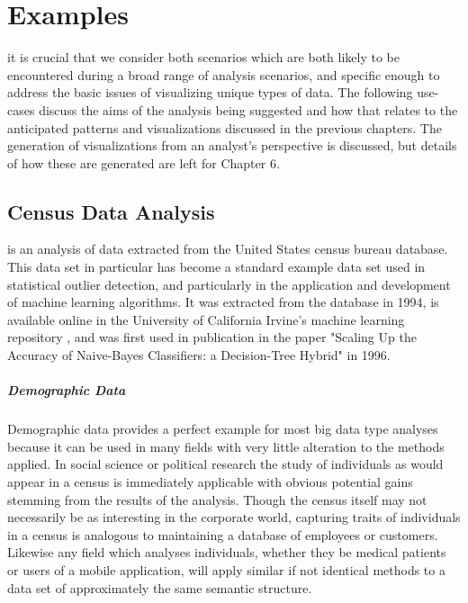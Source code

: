 \chapter{Examples}
\label{sec:examples}
 it is crucial that we consider both scenarios which are both likely to be encountered during a broad range of analysis scenarios, and specific enough to address the basic issues of visualizing unique types of data. The following use-cases discuss the aims of the analysis being suggested and how that relates to the anticipated patterns and visualizations discussed in the previous chapters. The generation of visualizations from an analyst's perspective is discussed, but details of how these are generated are left for Chapter 6.

\section{Census Data Analysis}
\label{sec:census}
 is an analysis of data extracted from the United States census bureau database. This data set in particular has become a standard example data set used in statistical outlier detection, and particularly in the application and development of machine learning algorithms. It was extracted from the database in 1994, is available online in the University of California Irvine's machine learning repository \cite{Blake1998}, and was first used in publication in the paper "Scaling Up the Accuracy of Naive-Bayes Classifiers: a Decision-Tree Hybrid"\cite{Kohavi1996} in 1996. 

\paragraph{Demographic Data}
Demographic data provides a perfect example for most big data type analyses because it can be used in many fields with very little alteration to the methods applied. In social science or political research the study of individuals as would appear in a census is immediately applicable with obvious potential gains stemming from the results of the  analysis. Though the census itself may not necessarily be as interesting in the corporate world, capturing traits of individuals in a census is analogous to maintaining a database of employees or customers. Likewise any field which analyses individuals, whether they be medical patients or users of a mobile application, will apply similar if not identical methods to a data set of approximately the same semantic structure. 

